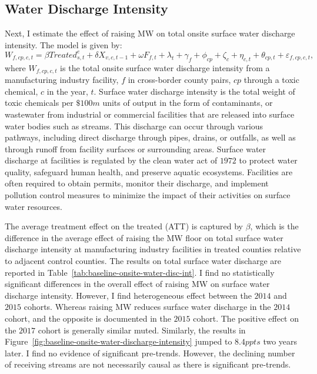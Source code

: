 \documentclass{C:/Users/david/OneDrive/Documents/ULMS/PhD/Thesis/chapter3/src/climate_change/latex/Economic_Journal/OUP-EJ}
\begin{document}
    \subsection{Water Discharge Intensity}\label{subsec:water-discharge-intensity}
    Next, I estimate the effect of raising MW on total onsite surface water discharge intensity. The model is given by:
    \begin{equation}
        W_{f,cp,c,t} = \beta Treated_{s,t}^e + \delta X_{v,c,t-1} + \omega F_{f,t} + \lambda_{t} + \gamma_{f} + \phi_{cp} + \zeta_{c} + \eta_{c,t} + \theta_{cp,t} + \varepsilon_{f,cp,c,t},\label{eq:baseline-onsite-water-discharge-intensity}
    \end{equation}
    where $W_{f,cp,c,t}$ is the total onsite surface water discharge intensity from a manufacturing industry facility, $f$ in cross-border county pairs, $cp$ through a toxic chemical, $c$ in the year, $t$. Surface water discharge intensity is the total weight of toxic chemicals per $\$100m$ units of output in the form of contaminants, or wastewater from industrial or commercial facilities that are released into surface water bodies such as streams. This discharge can occur through various pathways, including direct discharge through pipes, drains, or outfalls, as well as through runoff from facility surfaces or surrounding areas. Surface water discharge at facilities is regulated by the clean water act of $1972$ to protect water quality, safeguard human health, and preserve aquatic ecosystems. Facilities are often required to obtain permits, monitor their discharge, and implement pollution control measures to minimize the impact of their activities on surface water resources.
    

    The average treatment effect on the treated (ATT) is captured by $\beta$, which is the difference in the average effect of raising the MW floor on total surface water discharge intensity at manufacturing industry facilities in treated counties relative to adjacent control counties. The results on total surface water discharge are reported in Table~\ref{tab:baseline-onsite-water-disc-int}. I find no statistically significant differences in the overall effect of raising MW on surface water discharge intensity. However, I find heterogeneous effect between the $2014$ and $2015$ cohorts. Whereas raising MW reduces surface water discharge in the $2014$ cohort, and the opposite is documented in the $2015$ cohort. The positive effect on the $2017$ cohort is generally similar muted. Similarly, the results in Figure~\ref{fig:baseline-onsite-water-discharge-intensity} jumped to $8.4ppts$ two years later. I find no evidence of significant pre-trends. However, the declining number of receiving streams are not necessarily causal as there is significant pre-trends.
    
\end{document}
